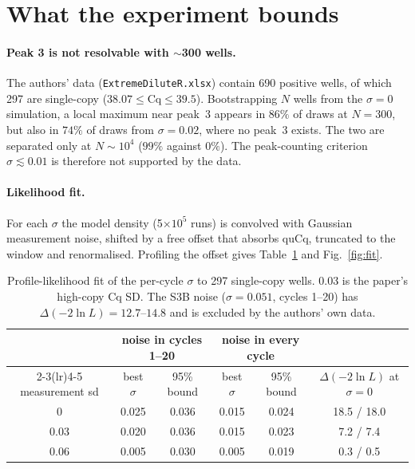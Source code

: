 \documentclass[11pt]{article}
\newcommand{\Cq}{\mathrm{Cq}}
\begin{document}
\section{What the experiment bounds}

\paragraph{Peak 3 is not resolvable with $\sim$300 wells.} The authors' data
(\texttt{ExtremeDiluteR.xlsx}) contain 690 positive wells, of which 297 are single-copy
($38.07\le\Cq\le39.5$). Bootstrapping $N$ wells from the $\sigma=0$ simulation, a local maximum
near peak~3 appears in $86\%$ of draws at $N=300$, but also in $74\%$ of draws from
$\sigma=0.02$, where no peak~3 exists. The two are separated only at $N\sim10^4$ ($99\%$
against $0\%$). The peak-counting criterion $\sigma\lesssim0.01$ is therefore not supported by
the data.

\paragraph{Likelihood fit.} For each $\sigma$ the model density (5$\times10^5$ runs) is
convolved with Gaussian measurement noise, shifted by a free offset that absorbs quCq,
truncated to the window and renormalised. Profiling the offset gives
Table~\ref{tab:fit} and Fig.~\ref{fig:fit}.

\begin{table}[htbp]
\centering
\begin{tabular}{@{}cccccc@{}}
\toprule
 & \multicolumn{2}{c}{noise in cycles 1--20} & \multicolumn{2}{c}{noise in every cycle} & \\
\cmidrule(lr){2-3}\cmidrule(lr){4-5}
measurement sd & best $\sigma$ & 95\% bound & best $\sigma$ & 95\% bound & $\Delta(-2\ln L)$ at $\sigma=0$ \\
\midrule
0    & 0.025 & 0.036 & 0.015 & 0.024 & 18.5 / 18.0 \\
0.03 & 0.020 & 0.036 & 0.015 & 0.023 & 7.2 / 7.4 \\
0.06 & 0.005 & 0.030 & 0.005 & 0.019 & 0.3 / 0.5 \\
\bottomrule
\end{tabular}
\caption{Profile-likelihood fit of the per-cycle $\sigma$ to 297 single-copy wells. 0.03 is
the paper's high-copy Cq SD. The S3B noise ($\sigma=0.051$, cycles 1--20) has
$\Delta(-2\ln L)=12.7$--$14.8$ and is excluded by the authors' own data.}
\label{tab:fit}
\end{table}
\end{document}
